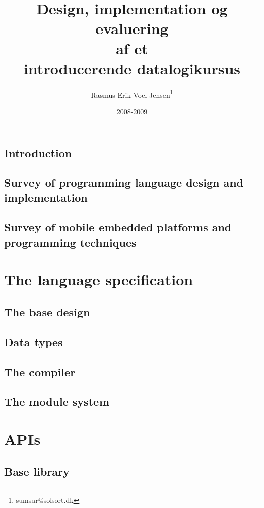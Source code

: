 \documentclass[12pt]{report}
\title{Design, implementation og evaluering \\ af et \\ introducerende datalogikursus}
\author{
  Rasmus Erik Voel Jensen\footnote{
    sumsar@solsort.dk
  }
}
\date{2008-2009}
\begin{document}

\maketitle

\setcounter{tocdepth}{1}
\tableofcontents
\listoffigures


\chapter{Introduction}
\chapter{Survey of programming language design and implementation}

\chapter{Survey of mobile embedded platforms and programming techniques}

\part{The language specification}
\chapter{The base design}
\chapter{Data types}
\chapter{The compiler}
\chapter{The module system}

\part{APIs}
\chapter{Base library}
\end{document}
